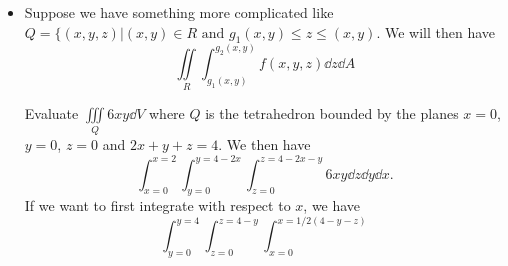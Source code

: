 \begin{itemize}
    \item Suppose we have something more complicated like $Q = \{(x,y,z) | (x,y) \in R\text{ and } g_1(x,y) \le z\le (x,y).$ We will then have
          \begin{equation}
              \iint\limits_R \int_{g_1(x,y)}^{g_2(x,y)} f(x,y,z)\dd{z}\dd{A}
          \end{equation}
          \begin{example}
              Evaluate $\iiint\limits_Q 6xy \dd{V}$ where $Q$ is the tetrahedron bounded by the planes $x=0$, $y=0$, $z=0$ and $2x+y+z=4$. We then have
              \begin{equation}
                  \int_{x=0}^{x=2}\int_{y=0}^{y=4-2x}\int_{z=0}^{z=4-2x-y} 6xy \dd{z}\dd{y}\dd{x}.
              \end{equation}
              If we want to first integrate with respect to $x$, we have
              \begin{equation}
                  \int_{y=0}^{y=4}\int_{z=0}^{z=4-y}\int_{x=0}^{x=1/2(4-y-z)}
              \end{equation}
          \end{example}
\end{itemize}